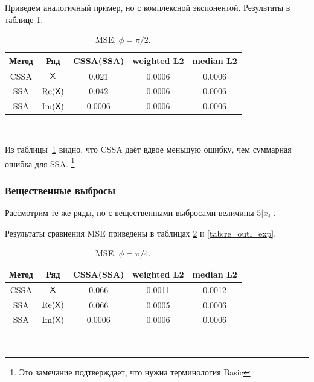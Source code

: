 \documentclass[specialist,
               substylefile = spbu.rtx,
               subf,href,colorlinks=true, 12pt]{disser}
\begin{document}
Приведём аналогичный пример, но с комплексной экспонентой. Результаты в таблице \ref{tab:th_ex_exp}.

\begin{table}[H]
	\caption{MSE, $\phi = \pi / 2$.}
	\label{tab:th_ex_exp}
	\begin{center}
		\begin{tabular}{|c|c|c|c|c|}
			\hline
			Метод & Ряд & CSSA(SSA) & weighted L2 & median L2 \\
			\hline
			CSSA & $\textsf{X}$ & 0.021 & 0.0006 & 0.0006\\
			\hline
			SSA & $\Re(\textsf{X})$ & 0.042 & 0.0006 &   0.0006\\
			\hline
			SSA & $\Im(\textsf{X})$ & 0.0006   & 0.0006 &   0.0006\\
			\hline
		\end{tabular} \\
	\end{center}
\end{table}

Из таблицы~\ref{tab:th_ex_exp} видно, что CSSA даёт вдвое меньшую ошибку, чем суммарная ошибка для SSA.
\footnote{Это замечание подтверждает, что нужна терминология Basic}

\subsubsection{Вещественные выбросы}
Рассмотрим те же ряды, но с вещественными выбросами величины $5|x_i|$.

Результаты сравнения MSE приведены в таблицах \ref{tab:re_outl} и \ref{tab:re_outl_exp}.
\begin{table}[H]
	\caption{MSE, $\phi = \pi/4$.}
	\label{tab:re_outl}
	\begin{center}
		\begin{tabular}{|c|c|c|c|c|}
			\hline
			Метод & Ряд & CSSA(SSA) & weighted L2 & median L2\\
			\hline
			CSSA & $\textsf{X}$ & 0.066 & 0.0011 & 0.0012\\
			\hline
			SSA & $\Re(\textsf{X})$ & 0.066 & 0.0005 &   0.0006\\
			\hline
			SSA & $\Im(\textsf{X})$ & 0.0006   & 0.0006 &   0.0006\\
			\hline
		\end{tabular} \\
	\end{center}
\end{table}
\end{document}
